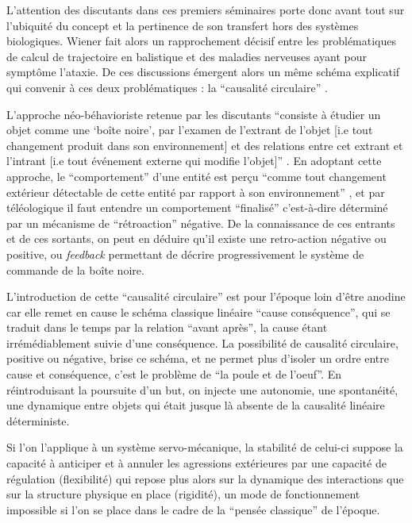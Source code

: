 L'attention des discutants dans ces premiers séminaires porte donc avant tout sur l'ubiquité du concept et la pertinence de son transfert hors des systèmes biologiques. Wiener fait alors un rapprochement décisif entre les problématiques de calcul de trajectoire en balistique et des maladies nerveuses ayant pour symptôme l'ataxie. De ces discussions émergent alors un même schéma explicatif qui convenir à ces deux problématiques : la \enquote{causalité circulaire} \autocite[774]{Pouvreau2013, Rosnay1975}.

L'approche néo-béhavioriste retenue par les discutants \enquote{consiste à étudier un objet comme une \enquote{boîte noire}, par l'examen de l'extrant de l'objet [i.e tout changement produit dans son environnement] et des relations entre cet extrant et l'intrant [i.e tout événement externe qui modifie l'objet]} \autocite{Pouvreau2013}. En adoptant cette approche, le \enquote{comportement} d'une entité est perçu \enquote{comme tout changement extérieur détectable de cette entité par rapport à son environnement} , et par téléologique il faut entendre un comportement \enquote{finalisé} c'est-à-dire déterminé par un mécanisme de \enquote{rétroaction} négative. De la connaissance de ces entrants et de ces sortants, on peut en déduire qu'il existe une retro-action négative ou positive, ou \textit{feedback} permettant de décrire progressivement le système de commande de la boîte noire.

L'introduction de cette \enquote{causalité circulaire} est pour l'époque loin d'être anodine car elle remet en cause le schéma classique linéaire \enquote {cause \textrightarrow conséquence}, qui se traduit dans le temps par la relation \enquote {avant \textrightarrow après}, la cause étant irrémédiablement suivie d'une conséquence. La possibilité de causalité circulaire, positive ou négative, brise ce schéma, et ne permet plus d'isoler un ordre entre cause et conséquence, c'est le problème de \enquote{la poule et de l'oeuf}. En réintroduisant la poursuite d'un but, on injecte une autonomie, une spontanéité, une dynamique entre objets qui était jusque là absente de la causalité linéaire déterministe.

Si l'on l'applique à un système servo-mécanique, la stabilité de celui-ci suppose la capacité à anticiper et à annuler les agressions extérieures par une capacité de régulation (flexibilité) qui repose plus alors sur la dynamique des interactions que sur la structure physique en place (rigidité), un mode de fonctionnement impossible si l'on se place dans le cadre de la \enquote{pensée classique} de l'époque.

